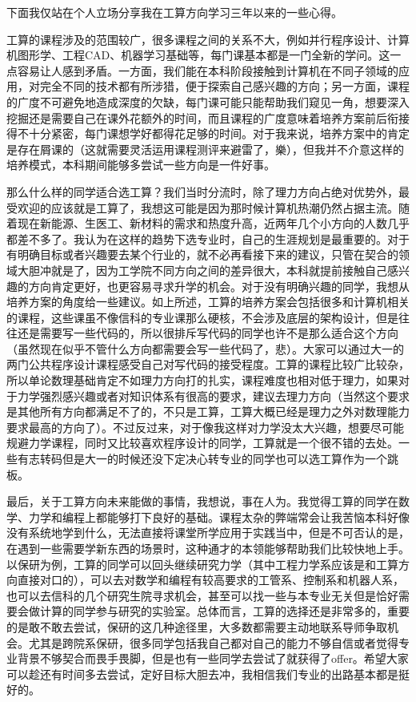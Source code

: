 \documentclass[11pt,oneside]{book}
\begin{document}
下面我仅站在个人立场分享我在工算方向学习三年以来的一些心得。

工算的课程涉及的范围较广，很多课程之间的关系不大，例如并行程序设计、计算机图形学、工程CAD、机器学习基础等，每门课基本都是一门全新的学问。这一点容易让人感到矛盾。一方面，我们能在本科阶段接触到计算机在不同子领域的应用，对完全不同的技术都有所涉猎，便于探索自己感兴趣的方向；另一方面，课程的广度不可避免地造成深度的欠缺，每门课可能只能帮助我们窥见一角，想要深入挖掘还是需要自己在课外花额外的时间，而且课程的广度意味着培养方案前后衔接得不十分紧密，每门课想学好都得花足够的时间。对于我来说，培养方案中的肯定是存在屑课的（这就需要灵活运用课程测评来避雷了，樂），但我并不介意这样的培养模式，本科期间能够多尝试一些方向是一件好事。

那么什么样的同学适合选工算？我们当时分流时，除了理力方向占绝对优势外，最受欢迎的应该就是工算了，我想这可能是因为那时候计算机热潮仍然占据主流。随着现在新能源、生医工、新材料的需求和热度升高，近两年几个小方向的人数几乎都差不多了。我认为在这样的趋势下选专业时，自己的生涯规划是最重要的。对于有明确目标或者兴趣要去某个行业的，就不必再看接下来的建议，只管在契合的领域大胆冲就是了，因为工学院不同方向之间的差异很大，本科就提前接触自己感兴趣的方向肯定更好，也更容易寻求升学的机会。对于没有明确兴趣的同学，我想从培养方案的角度给一些建议。如上所述，工算的培养方案会包括很多和计算机相关的课程，这些课虽不像信科的专业课那么硬核，不会涉及底层的架构设计，但是往往还是需要写一些代码的，所以很排斥写代码的同学也许不是那么适合这个方向（虽然现在似乎不管什么方向都需要会写一些代码了，悲）。大家可以通过大一的两门公共程序设计课程感受自己对写代码的接受程度。工算的课程比较广比较杂，所以单论数理基础肯定不如理力方向打的扎实，课程难度也相对低于理力，如果对于力学强烈感兴趣或者对知识体系有很高的要求，建议去理力方向（当然这个要求是其他所有方向都满足不了的，不只是工算，工算大概已经是理力之外对数理能力要求最高的方向了）。不过反过来，对于像我这样对力学没太大兴趣，想要尽可能规避力学课程，同时又比较喜欢程序设计的同学，工算就是一个很不错的去处。一些有志转码但是大一的时候还没下定决心转专业的同学也可以选工算作为一个跳板。

最后，关于工算方向未来能做的事情，我想说，事在人为。我觉得工算的同学在数学、力学和编程上都能够打下良好的基础。课程太杂的弊端常会让我苦恼本科好像没有系统地学到什么，无法直接将课堂所学应用于实践当中，但是不可否认的是，在遇到一些需要学新东西的场景时，这种通才的本领能够帮助我们比较快地上手。以保研为例，工算的同学可以回头继续研究力学（其中工程力学系应该是和工算方向直接对口的），可以去对数学和编程有较高要求的工管系、控制系和机器人系，也可以去信科的几个研究生院寻求机会，甚至可以找一些与本专业无关但是恰好需要会做计算的同学参与研究的实验室。总体而言，工算的选择还是非常多的，重要的是敢不敢去尝试，保研的这几种途径里，大多数都需要主动地联系导师争取机会。尤其是跨院系保研，很多同学包括我自己都对自己的能力不够自信或者觉得专业背景不够契合而畏手畏脚，但是也有一些同学去尝试了就获得了offer。希望大家可以趁还有时间多去尝试，定好目标大胆去冲，我相信我们专业的出路基本都是挺好的。
\end{document}
